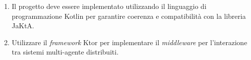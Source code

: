 \begin{enumerate}
      \item  Il progetto deve essere implementato utilizzando il linguaggio di programmazione Kotlin per garantire coerenza e compatibilità con la libreria JaKtA.
      \item Utilizzare il \textit{framework} Ktor per implementare il \textit{middleware} per l'interazione tra sistemi multi-agente distribuiti.
\end{enumerate}


